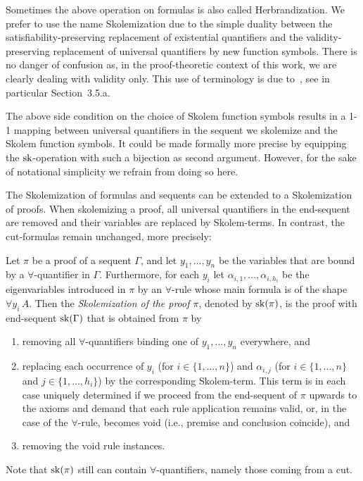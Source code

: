 \documentclass{LMCS}
\theoremstyle{plain}
\theoremstyle{definition}
\def\set#1{\{#1\}}
\begin{document}
\begin{rem}
Sometimes the above operation on formulas is also called Herbrandization. We
prefer to use the name Skolemization due to the simple duality between the
satisfiability-preserving replacement of existential quantifiers and the
validity-preserving replacement of universal quantifiers by new function
symbols. There is no danger of confusion as, in the proof-theoretic context
of this work, we are clearly dealing with validity only. This use of terminology
is due to~\cite{Hilbert39Grundlagen2}, see in particular Section~3.5.a.
\end{rem}

The above side condition on the choice of Skolem function symbols results in
a 1-1 mapping between universal quantifiers
in the sequent we skolemize and the Skolem function symbols. It could be
made formally more precise by equipping the $\mathrm{sk}$-operation with such a bijection
as second argument. However, for the sake of notational simplicity we refrain
from doing so here.

The Skolemization of formulas and sequents can be extended to a Skolemization of proofs. When
skolemizing a proof, all universal quantifiers in the end-sequent are removed and their variables are replaced
by Skolem-terms. In contrast, the cut-formulas remain unchanged, more precisely:
\begin{defi}
  Let $\pi$ be a proof of a sequent $\Gamma$, and let $y_1,\ldots,y_n$
  be the variables that are bound by a $\forall$-quantifier in
  $\Gamma$. Furthermore, for each $y_i$ let
  $\alpha_{i,1},\ldots,\alpha_{i,h_i}$ be the eigenvariables
  introduced in $\pi$ by an $\forall$-rule whose main formula is of the
  shape $\forall y_i\, A$.  Then the \emph{Skolemization of the proof $\pi$},
  denoted by $\mathrm{sk}(\pi)$, is the proof with end-sequent $\mathrm{sk}(\Gamma)$
  that is obtained from $\pi$ by 
  \begin{enumerate}
  \item removing all $\forall$-quantifiers binding one of
    $y_1,\ldots,y_n$ everywhere, and
  \item replacing each occurrence of $y_i$ (for
    $i\in\set{1,\ldots,n}$) and $\alpha_{i,j}$ (for
    $i\in\set{1,\ldots,n}$ and $j\in\set{1,\ldots,h_i}$) by the
    corresponding Skolem-term. This term is in each case uniquely
    determined if we proceed from the end-sequent of $\pi$ upwards to
    the axioms and demand that each rule application remains valid,
    or, in the case of the $\forall$-rule, becomes void (i.e., premise
    and conclusion coincide), and
  \item removing the void rule instances.
  \end{enumerate}
  Note that $\mathrm{sk}(\pi)$ still can contain $\forall$-quantifiers, namely
  those coming from a cut.
\end{defi}
\end{document}
